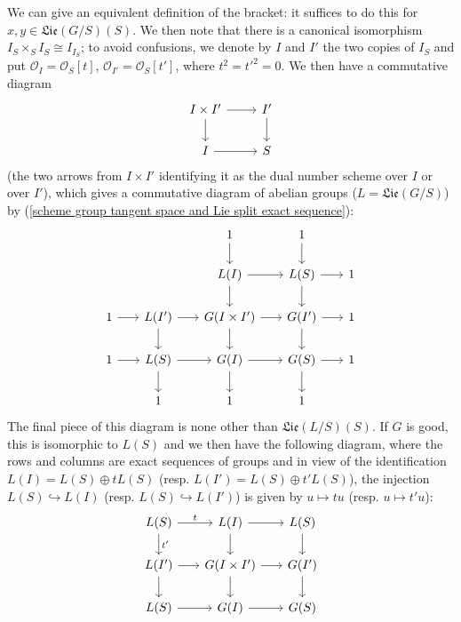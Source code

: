 \begin{remark}\label{scheme group Lie bracket definition by diagram}
We can give an equivalent definition of the bracket: it suffices to do this for $x,y\in\mathfrak{Lie}(G/S)(S)$. We then note that there is a canonical isomorphism $I_S\times_SI_S\cong I_{I_S}$; to avoid confusions, we denote by $I$ and $I'$ the two copies of $I_S$ and put $\mathscr{O}_I=\mathscr{O}_S[t]$, $\mathscr{O}_{I'}=\mathscr{O}_S[t']$, where $t^2=t'^2=0$. We then have a commutative diagram
\[\begin{tikzcd}
I\times I'\ar[d]\ar[r]&I'\ar[d]\\
I\ar[r]&S
\end{tikzcd}\]
(the two arrows from $I\times I'$ identifying it as the dual number scheme over $I$ or over $I'$), which gives a commutative diagram of abelian groups ($L=\mathfrak{Lie}(G/S)$) by (\ref{scheme group tangent space and Lie split exact sequence}):
\begin{equation}
\begin{tikzcd}[row sep=6mm,column sep=6mm]
&&1\ar[d]&1\ar[d]&\\
&&L(I)\ar[d]\ar[r]&L(S)\ar[d]\ar[r]&1\\
1\ar[r]&L(I')\ar[r]\ar[d]&G(I\times I')\ar[r]\ar[d]&G(I')\ar[r]\ar[d]&1\\
1\ar[r]&L(S)\ar[r]\ar[d]&G(I)\ar[r]\ar[d]&G(S)\ar[r]\ar[d]&1\\
&1&1&1
\end{tikzcd}
\end{equation}
The final piece of this diagram is none other than $\mathfrak{Lie}(L/S)(S)$. If $G$ is good, this is isomorphic to $L(S)$ and we then have the following diagram, where the rows and columns are exact sequences of groups and in view of the identification $L(I)=L(S)\oplus tL(S)$ (resp. $L(I')=L(S)\oplus t'L(S)$), the injection $L(S)\hookrightarrow L(I)$ (resp. $L(S)\hookrightarrow L(I')$) is given by $u\mapsto tu$ (resp. $u\mapsto t'u$):
\begin{equation}
\begin{tikzcd}[row sep=6mm,column sep=6mm]
L(S)\ar[r,"t"]\ar[d,"t'"]&L(I)\ar[r]\ar[d]&L(S)\ar[d]\\
L(I')\ar[r]\ar[d]&G(I\times I')\ar[r]\ar[d]&G(I')\ar[d]\\
L(S)\ar[r]&G(I)\ar[r]&G(S)
\end{tikzcd}
\end{equation}


\end{remark}

